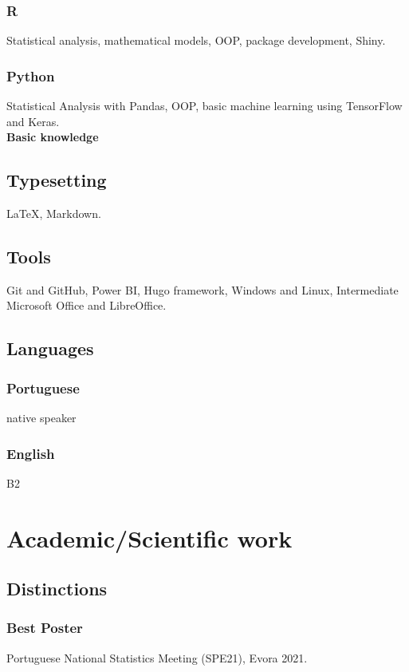 \documentclass[11pt,oneside,a4paper,titlepage]{article}
\begin{document}
\subsubsection{R}
Statistical analysis, mathematical models, OOP, package development, Shiny.
\subsubsection{Python}
Statistical Analysis with Pandas, OOP, basic machine learning using TensorFlow and Keras.
\\[2mm]
\textcolor{textGrey}{\textbf{Basic knowledge}}\\

\subsection{  Typesetting}
 \quad \LaTeX, Markdown.

\subsection{  Tools}
 \quad Git and GitHub, Power BI, Hugo framework, Windows and Linux, Intermediate Microsoft Office and LibreOffice.

\subsection{  Languages}
\subsubsection{Portuguese}
native speaker
\subsubsection{English}
B2

\section{Academic/Scientific work}

\subsection{  Distinctions}
\subsubsection{Best Poster}
Portuguese National Statistics Meeting (SPE21), Evora 2021.
\end{document}

